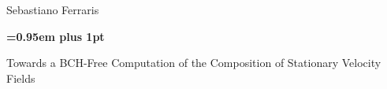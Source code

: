 \documentclass[a4paper,10pt]{book}
\theoremstyle{definition}
\begin{document}
\begin{titlepage}
%
\pagestyle{empty}
\begingroup
\vspace*{-7\topskip}

\vspace{-0.95 cm}

\begin{figure}[!h]
		\hspace{-2.5cm} %
\end{figure}
\vspace{1cm}

\begin{center}
	{\LARGE{Sebastiano Ferraris}\par}
\end{center}
\vspace{1.8cm}
\begin{center}
        {\huge\bf \baselineskip=0.95em plus 1pt \expandafter{
        		Towards a BCH-Free Computation of the Composition of Stationary Velocity Fields
        \par}}
\end{center}



\vspace{2.7cm}


\end{titlepage}
\end{document}
